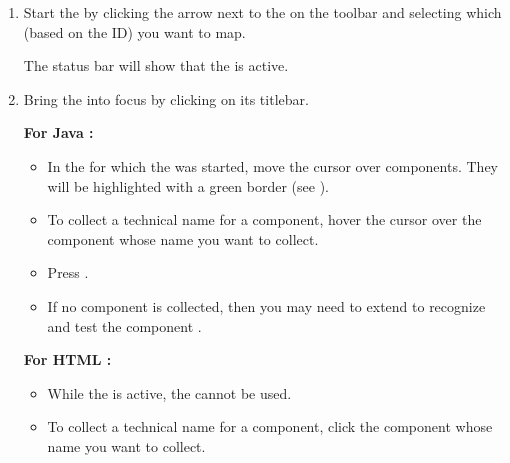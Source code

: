 \begin{enumerate}
\item Start the \gdomm{} by clicking the arrow next to the on the toolbar and selecting which \gdaut{} (based on the \gdaut{} ID) you want to map. 


The status bar will show that the \gdomm{} is active. 
\item Bring the \gdaut{} into focus by clicking on its titlebar. 

\textbf{For Java \gdauts{}:}
\begin{itemize}
\item In the \gdaut{} for which the \gdomm{} was started, move the cursor over components. They will be highlighted with a green border (see ). 
\item To collect a technical name for a component, hover the cursor over the component whose name you want to collect. 
\item Press .
\item If no component is collected, then you may need to extend \app{} to recognize and test the component .
\end{itemize}
\textbf{For HTML \gdauts{}:}
\begin{itemize}
\item While the \gdomm{} is active, the \gdaut{} cannot be used. 
\item To collect a technical name for a component, click the component whose name you want to collect. 
\end{itemize}


\end{enumerate}
